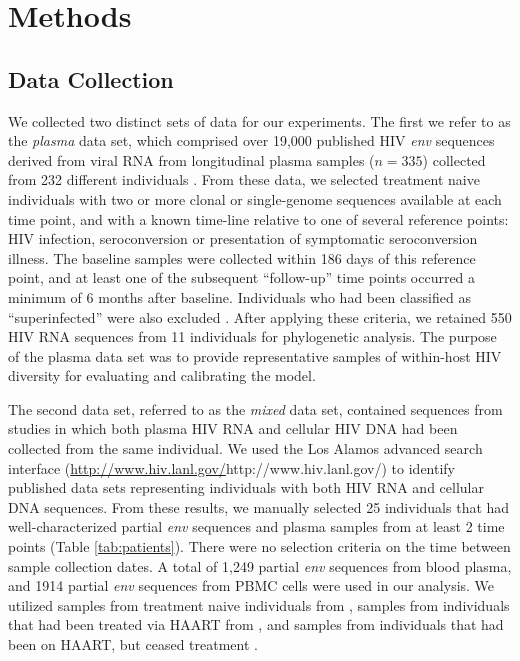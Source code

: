 \documentclass[12pt]{article}
\begin{document}

\section * {Methods} \label{sec:methods}



\subsection * {Data Collection} \label{subsec:dcollection}
We collected two distinct sets of data for our experiments. 
The first we refer to as the {\em plasma} data set, which comprised over 19,000 published HIV \textit{env} sequences derived from viral RNA from longitudinal plasma samples ($n=335$) collected from 232 different individuals \citep{McCloskey14}. 
From these data, we selected treatment naive individuals with two or more clonal or single-genome sequences available at each time point, and with a known time-line relative to one of several reference points: HIV infection, seroconversion or presentation of symptomatic seroconversion illness. 
The baseline samples were collected within 186 days of this reference point, and at least one of the subsequent ``follow-up'' time points occurred a minimum of 6 months after baseline.
Individuals who had been classified as ``superinfected'' were also excluded \citep{McCloskey14}. 
After applying these criteria, we retained 550 HIV RNA sequences from 11 individuals for phylogenetic analysis.
The purpose of the plasma data set was to provide representative samples of within-host HIV diversity for evaluating and calibrating the model.

The second data set, referred to as the {\em mixed} data set, contained sequences from studies in which both plasma HIV RNA and cellular HIV DNA had been collected from the same individual.
We used the Los Alamos advanced search interface (\url{http://www.hiv.lanl.gov/}{http://www.hiv.lanl.gov/}) to identify published data sets representing individuals with both HIV RNA and cellular DNA sequences.
From these results, we manually selected 25 individuals that had well-characterized partial {\em env} sequences and plasma samples from at least 2 time points (Table \ref{tab:patients}). 
There were no selection criteria on the time between sample collection dates. 
A total of 1,249 partial {\em env} sequences from blood plasma, and 1914 partial {\em env} sequences from PBMC cells were used in our analysis. 
We utilized samples from treatment naive individuals from \cite{Shankarappa99, Novitsky09}, samples from individuals that had been treated via HAART from \cite{Llewellyn06}, and samples from individuals that had been on HAART, but ceased treatment \cite{Fischer04}. 
 
\end{document}
